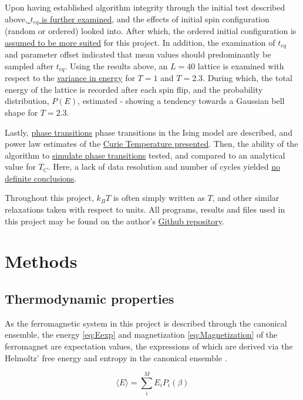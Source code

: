 \documentclass[%
oneside,                 %
final,                   %
10pt]{article}
\begin{document}
Upon having established algorithm integrity through the initial test described above,\hyperref[SS:M.Eq.time]{ $t_{eq}$ is further examined}, and the effects of initial spin configuration (random or ordered) looked into. After which, the ordered initial configuration is \hyperref[SS:Disucssion_eqtime]{assumed to be more suited} for this project. In addition, the examination of $t_{eq}$ and parameter offset indicated that mean values should predominantly be sampled after $t_{eq}$. Using the results above, an $L=40$ lattice is examined with respect to the \hyperref[SS:M.variance ]{variance in energy} for $T=1$ and $T=2.3$. During which, the total energy of the lattice is recorded after each spin flip, and the probability distribution, $P(E)$, estimated - showing a tendency towards a Gaussian bell shape for $T=2.3$. \newline

Lastly, \hyperref[SS:M.Phase_trans]{phase transitions} phase transitions in the Ising model are described, and power law estimates of the \hyperref[SS:Est.Curie]{Curie Temperature presented}. Then, the ability of the algorithm to \hyperref[SS.estCurie]{simulate phase transitions} tested, and compared to an analytical value for $T_C$. Here, a lack of data resolution and number of cycles yielded \hyperref[SS:DR.est.curie]{no definite conclusions}. \newline

Throughout this project, $k_B T$ is often simply written as $T$, and other similar relaxations taken with respect to units. All programs, results and files used in this project may be found on the author's \href{https://github.com/johanere/CP4}{Github repository}.

\section{Methods}

\subsection{Thermodynamic properties}
\label{SS:thermodynamic.properties}	
As the ferromagnetic system in this project is described through the 
canonical ensemble, the energy \eqref{eq:Eexp} and magnetization \eqref{eq:Magnetization} of the ferromagnet are expectation values, the expressions of which are derived via the Helmoltz' free energy and entropy in the canonical ensemble \cite{HJ-SP}. 


\begin{equation}
\langle E \rangle = \sum_i^M E_i P_i (\beta)
\label{eq:Eexp}
\end{equation}
\end{document}
